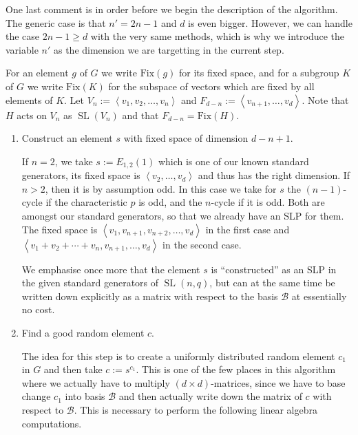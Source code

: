 \documentclass[a4paper,11pt]{article}
\def\SL{\operatorname{SL}}
\newcommand{\Fix}[1]{\mathrm{Fix}(#1)}
\newcommand{\B}{\mathcal{B}}
\begin{document}
One last comment is in order before we begin the description of the
algorithm. The generic case is that $n'=2n-1$ and $d$ is even bigger.
However, we can handle the case $2n-1 \ge d$ with the very same
methods, which is why we introduce the variable $n'$ as the dimension
we are targetting in the current step.

For an element $g$ of $G$ we write
$\Fix g$ for its fixed space, and for a subgroup $K$ of $G$ we write
$\Fix K$ for the subspace of vectors which are fixed by all elements
of $K$.
Let $V_n := \left< v_1, v_2, \ldots, v_n\right>$ and $F_{d-n} :=
\left< v_{n+1}, \ldots, v_d \right>$. Note that $H$ acts on $V_n$ as
$\SL(V_n)$ and that $F_{d-n} = \Fix H$.

\smallskip
\begin{enumerate}
\item Construct an element $s$ with fixed space of dimension $d-n+1$.

If $n=2$, we take $s := E_{1,2}(1)$ which is one of our known standard
generators, its fixed space is $\left< v_2, \ldots, v_d\right>$ and thus
has the right dimension. If $n > 2$, then it is by assumption odd.
In this case we take for $s$ the $(n-1)$-cycle if the characteristic $p$
is odd, and the $n$-cycle if it is odd. Both are amongst our
standard generators, so that we already have an SLP for them. The fixed
space is $\left< v_1, v_{n+1}, v_{n+2}, \ldots, v_d\right>$ in the first
case and $\left< v_1+v_2+\cdots+v_n, v_{n+1}, \ldots, v_d\right>$ in the
second case.

We emphasise once more that the element $s$ is ``constructed'' as an SLP in
the given standard generators of $\SL(n,q)$, but can at the same time be
written down explicitly as a matrix with respect to the basis $\B$ at
essentially no cost.
\item Find a good random element $c$.

The idea for this step is to create a uniformly distributed random element 
$c_1$ in $G$ and then take $c := s^{c_1}$. This is one of the few places
in this algorithm where we actually have to multiply $(d \times
d)$-matrices, since we have to base change $c_1$ into basis $\B$ and
then actually write down the matrix of $c$ with respect to $\B$. This
is necessary to perform the following linear algebra computations.


\end{enumerate}
\end{document}
